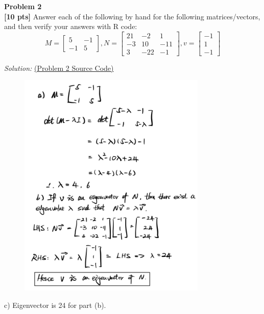 \documentclass{article}
\newenvironment{problem}[2][Problem]
    { \begin{mdframed}[backgroundcolor=gray!20] \textbf{#1 #2} \\}
    {  \end{mdframed}}
\newenvironment{solution}
    {\textit{Solution:}}
    {}
\begin{document}
\newpage
\begin{problem}{2}
\textbf{[10 pts]}
Answer each of the following by hand for the following matrices/vectors, and then verify your answers with R code:
\begin{equation}
M = 
\begin{bmatrix}
5 & -1 \\
-1 & 5
\end{bmatrix}, 
N = 
\begin{bmatrix}
21 & -2 & 1 \\
-3 & 10 & -11 \\
3 & -22 & -1
\end{bmatrix},
v =
\begin{bmatrix}
-1\\
1\\
-1
\end{bmatrix}
\end{equation}
\end{problem}
\begin{solution}
\href{run:./src/p2.r}{ (Problem 2 Source Code)}
	\begin{figure}[h]\mbox{}
		\centering
		\includegraphics[width=0.8\textwidth]{figure2.jpg}
	\end{figure}
	\newline
c) Eigenvector is 24 for part (b).
\end{solution}
\end{document}
